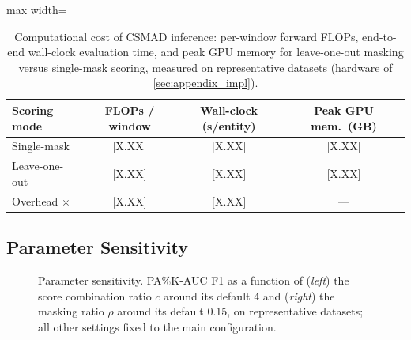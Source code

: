 \begin{table}[tp]
\footnotesize
\centering
\caption{Computational cost of CSMAD inference: per-window forward FLOPs, end-to-end wall-clock
  evaluation time, and peak GPU memory for leave-one-out masking versus single-mask scoring,
  measured on representative datasets (hardware of \ref{sec:appendix_impl}).}
\label{tab:compute}
\begin{adjustbox}{max width=\linewidth}
\begin{tabular}{lccc}
\toprule
Scoring mode & FLOPs / window & Wall-clock (s/entity) & Peak GPU mem.\ (GB) \\
\midrule
Single-mask   & {[X.XX]} & {[X.XX]} & {[X.XX]} \\
Leave-one-out & {[X.XX]} & {[X.XX]} & {[X.XX]} \\
Overhead $\times$ & {[X.XX]} & {[X.XX]} & --- \\
\bottomrule
\end{tabular}
\end{adjustbox}
\end{table}

\subsection{Parameter Sensitivity}
\label{sec:param_sensitivity}

\begin{figure}[h]
  \centering
  \caption{Parameter sensitivity. PA\%K-AUC F1 as a function of (\textit{left}) the score
    combination ratio $c$ around its default 4 and (\textit{right}) the masking ratio $\rho$
    around its default 0.15, on representative datasets; all other settings fixed to the main
    configuration.}
  \label{fig:param_sensitivity}
\end{figure}

